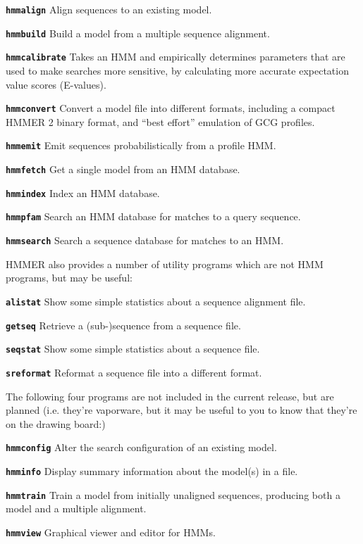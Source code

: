 \documentclass[11pt]{report}
\newenvironment{wideitem}{\begin{list} 
     {}
     { \setlength{\labelwidth}{2in}\setlength{\leftmargin}{1.5in}}}
     {\end{list}}
\newcommand{\emprog}[1]{{\bfseries\texttt{#1}}}
\begin{document}
\begin{wideitem}
\item[\emprog{hmmalign}] Align sequences to an existing model.
\item[\emprog{hmmbuild}] Build a model from a multiple sequence alignment.
\item[\emprog{hmmcalibrate}] Takes an HMM and empirically determines
parameters that are used to make searches more sensitive, by
calculating more accurate expectation value scores (E-values).
\item[\emprog{hmmconvert}] Convert a model file into different formats,
including a compact HMMER 2 binary format, and ``best effort''
emulation of GCG profiles.
\item[\emprog{hmmemit}] Emit sequences probabilistically from a profile HMM.
\item[\emprog{hmmfetch}] Get a single model from an HMM database.
\item[\emprog{hmmindex}] Index an HMM database.
\item[\emprog{hmmpfam}] Search an HMM database for matches to a query sequence.
\item[\emprog{hmmsearch}] Search a sequence database for matches to an HMM.
\end{wideitem}

HMMER also provides a number of utility programs which are not HMM
programs, but may be useful:

\begin{wideitem}
\item[\emprog{alistat}] Show some simple statistics about a sequence
alignment file.
\item[\emprog{getseq}] Retrieve a (sub-)sequence from a sequence file.
\item[\emprog{seqstat}] Show some simple statistics about a sequence file.
\item[\emprog{sreformat}] Reformat a sequence file into a different format.
\end{wideitem}

The following four programs are not included in the current release,
but are planned (i.e. they're vaporware, but it may be useful to you
to know that they're on the drawing board:)

\begin{wideitem}
\item[\emprog{hmmconfig}] Alter the search configuration of an existing model.
\item[\emprog{hmminfo}] Display summary information about the model(s) in a file.
\item[\emprog{hmmtrain}] Train a model from initially unaligned sequences,
producing both a model and a multiple alignment.
\item[\emprog{hmmview}] Graphical viewer and editor for HMMs.
\end{wideitem}
\end{document}

